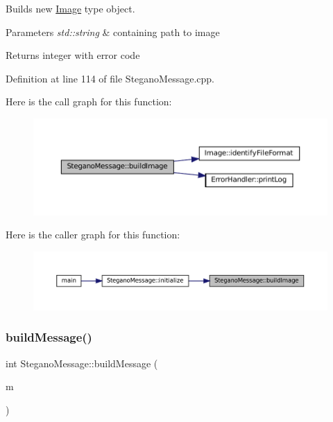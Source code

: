 Builds new \mbox{\hyperlink{classImage}{Image}} type object. 


\begin{DoxyParams}{Parameters}
{\em std\+::string} & containing path to image \\
\hline
\end{DoxyParams}
\begin{DoxyReturn}{Returns}
integer with error code 
\end{DoxyReturn}


Definition at line 114 of file Stegano\+Message.\+cpp.

Here is the call graph for this function\+:\nopagebreak
\begin{figure}[H]
\begin{center}
\leavevmode
\includegraphics[width=350pt]{classSteganoMessage_ad90a4cf8cf03febfb4c3df955ccab13d_cgraph}
\end{center}
\end{figure}
Here is the caller graph for this function\+:\nopagebreak
\begin{figure}[H]
\begin{center}
\leavevmode
\includegraphics[width=350pt]{classSteganoMessage_ad90a4cf8cf03febfb4c3df955ccab13d_icgraph}
\end{center}
\end{figure}
\mbox{\label{classSteganoMessage_a43a7d1579509a4004a86ad70dad10f65}} 
\subsubsection{\texorpdfstring{buildMessage()}{buildMessage()}}
{\footnotesize\ttfamily int Stegano\+Message\+::build\+Message (\begin{DoxyParamCaption}\item[{std\+::string}]{m }\end{DoxyParamCaption})}



